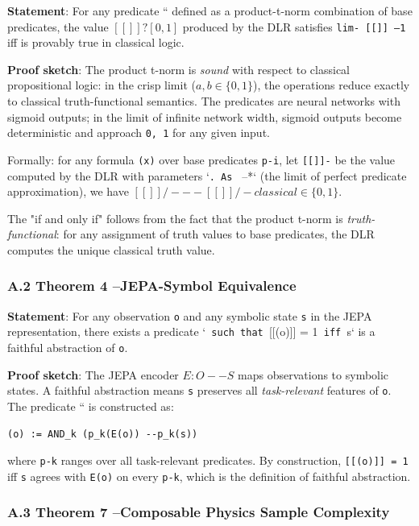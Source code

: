 \documentclass[11pt]{article}
\begin{document}
\textbf{Statement}: For any predicate `` defined as a product-t-norm combination of
base predicates, the value $[[]] ?[0, 1]$ produced by the DLR satisfies
\texttt{lim-{} [[]] --1} iff  is provably true in classical logic.

\textbf{Proof sketch}: The product t-norm is \textit{sound} with respect to classical
propositional logic: in the crisp limit ($a, b \in \{0,1\}$), the operations
reduce exactly to classical truth-functional semantics. The predicates are
neural networks with sigmoid outputs; in the limit of infinite network width,
sigmoid outputs become deterministic and approach \texttt{{0, 1}} for any given input.

Formally: for any formula \texttt{(x)} over base predicates \texttt{p-i}, let \texttt{[[]]-} be the
value computed by the DLR with parameters `\texttt{. As } --*` (the limit of perfect
predicate approximation), we have $[[]]/- --[[]]/-classical \in \{0,1\}$.

The "if and only if" follows from the fact that the product t-norm is
\textit{truth-functional}: for any assignment of truth values to base predicates, the
DLR computes the unique classical truth value.

\subsubsection{A.2 Theorem 4 --JEPA-Symbol Equivalence}

\textbf{Statement}: For any observation \texttt{o} and any symbolic state \texttt{s} in the JEPA
representation, there exists a predicate `\texttt{ such that }[[(o)]] = 1\texttt{ iff }s`
is a faithful abstraction of \texttt{o}.

\textbf{Proof sketch}: The JEPA encoder $E: O --S$ maps observations to symbolic
states. A faithful abstraction means \texttt{s} preserves all \textit{task-relevant} features
of \texttt{o}. The predicate `` is constructed as:

\begin{verbatim}
(o) := AND_k (p_k(E(o)) --p_k(s))
\end{verbatim}

where \texttt{p-k} ranges over all task-relevant predicates. By construction,
\texttt{[[(o)]] = 1} iff \texttt{s} agrees with \texttt{E(o)} on every \texttt{p-k}, which is the
definition of faithful abstraction.

\subsubsection{A.3 Theorem 7 --Composable Physics Sample Complexity}
\end{document}
